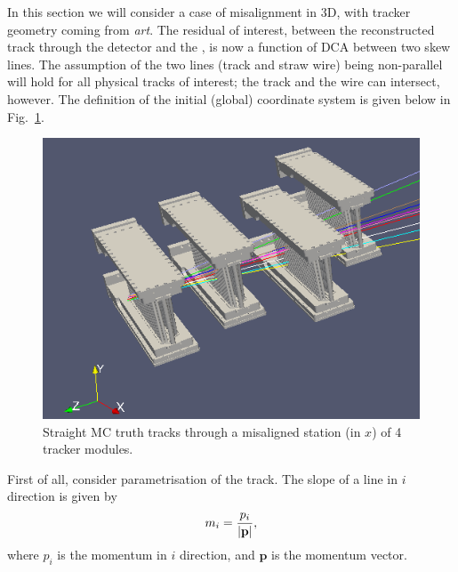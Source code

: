 \documentclass[a4paper,11pt]{article}
\begin{document}
In this section we will consider a case of misalignment in 3D, with tracker geometry coming from \textit{art}. The residual of interest, between the reconstructed track through the detector and the , is now a function of DCA between two skew lines. The assumption of the two lines (track and straw wire) being non-parallel will hold for all physical tracks of interest; the track and the wire can intersect, however. The definition of the initial (global) coordinate system is given below in Fig.~\ref{fig:4M}. \\
\vspace{-0.2cm}
\begin{figure}[!ht]
\centering
\includegraphics[scale = 0.45]{fig/4M.png}  
    \vspace{-0.1cm}
    \caption{Straight MC truth tracks through a misaligned station (in $x$) of 4 tracker modules.}
\label{fig:4M} 
\end{figure}
\vspace{-0.2cm}
First of all, consider parametrisation of the track. The slope of a line in $i$ direction is given by
\begin{equation}
m_i = \frac{p_i}{|\bf{p}|}, 	
\end{equation}
where $p_i$ is the momentum in $i$ direction, and $\textbf{p}$ is the momentum vector. 
\end{document}
